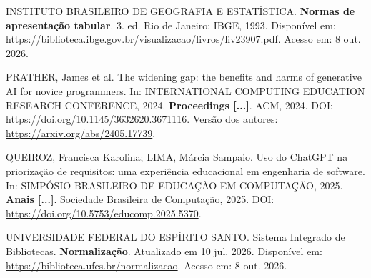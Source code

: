\begin{singlespace}
INSTITUTO BRASILEIRO DE GEOGRAFIA E ESTATÍSTICA. \textbf{Normas de apresentação tabular}. 3. ed. Rio de Janeiro: IBGE, 1993. Disponível em: \url{https://biblioteca.ibge.gov.br/visualizacao/livros/liv23907.pdf}. Acesso em: 8 out. 2026.

PRATHER, James et al. The widening gap: the benefits and harms of generative AI for novice programmers. In: INTERNATIONAL COMPUTING EDUCATION RESEARCH CONFERENCE, 2024. \textbf{Proceedings [...]}. ACM, 2024. DOI: \url{https://doi.org/10.1145/3632620.3671116}. Versão dos autores: \url{https://arxiv.org/abs/2405.17739}.

QUEIROZ, Francisca Karolina; LIMA, Márcia Sampaio. Uso do ChatGPT na priorização de requisitos: uma experiência educacional em engenharia de software. In: SIMPÓSIO BRASILEIRO DE EDUCAÇÃO EM COMPUTAÇÃO, 2025. \textbf{Anais [...]}. Sociedade Brasileira de Computação, 2025. DOI: \url{https://doi.org/10.5753/educomp.2025.5370}.

UNIVERSIDADE FEDERAL DO ESPÍRITO SANTO. Sistema Integrado de Bibliotecas. \textbf{Normalização}. Atualizado em 10 jul. 2026. Disponível em: \url{https://biblioteca.ufes.br/normalizacao}. Acesso em: 8 out. 2026.
\end{singlespace}
